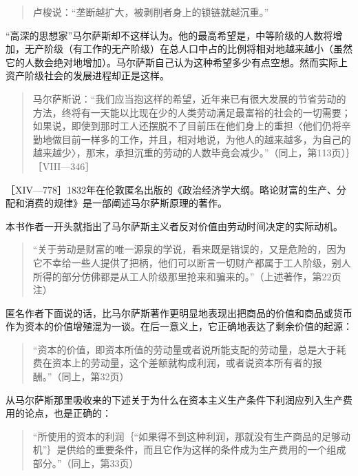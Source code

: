 \begin{quote}{卢梭说：“垄断越扩大，被剥削者身上的锁链就越沉重。”}\end{quote}

“高深的思想家”马尔萨斯却不这样认为。他的最高希望是，中等阶级的人数将增加，无产阶级（有工作的无产阶级）在总人口中占的比例将相对地越来越小（虽然它的人数会绝对地增加）。马尔萨斯自己认为这种希望多少有点空想。然而实际上资产阶级社会的发展进程却正是这样。

\begin{quote}{马尔萨斯说：“我们应当抱这样的希望，近年来已有很大发展的节省劳动的方法，终将有一天能以比现在少的人类劳动满足最富裕的社会的一切需要；如果说，即使到那时工人还摆脱不了目前压在他们身上的重担〈他们仍将辛勤地做目前一样多的工作，并且，相对地说，为他人的越来越多，为自己的越来越少〉，那末，承担沉重的劳动的人数毕竟会减少。”（同上，第113页）｝［VIII—346］}\end{quote}


［XIV—778］1832年在伦敦匿名出版的《政治经济学大纲。略论财富的生产、分配和消费的规律》是一部阐述马尔萨斯原理的著作。

本书作者一开头就指出了马尔萨斯主义者反对价值由劳动时间决定的实际动机。

\begin{quote}{“关于劳动是财富的唯一源泉的学说，看来既是错误的，又是危险的，因为它不幸给一些人提供了把柄，他们可以断言一切财产都属于工人阶级，别人所得的部分仿佛都是从工人阶级那里抢来和骗来的。”（上述著作，第22页注）}\end{quote}

匿名作者下面说的话，比马尔萨斯著作更明显地表现出把商品的价值和商品或货币作为资本的价值增殖混为一谈。在后一意义上，它正确地表达了剩余价值的起源：

\begin{quote}{“资本的价值，即资本所值的劳动量或者说所能支配的劳动量，总是大于耗费在资本上的劳动量，这个差额就构成利润，或者说资本所有者的报酬。”（同上，第32页）}\end{quote}

从马尔萨斯那里吸收来的下述关于为什么在资本主义生产条件下利润应列入生产费用的论点，也是正确的：

\begin{quote}{“所使用的资本的利润｛“如果得不到这种利润，那就没有生产商品的足够动机”｝是供给的重要条件，而且它作为这样的条件成为生产费用的一个组成部分。”（同上，第33页）}\end{quote}

